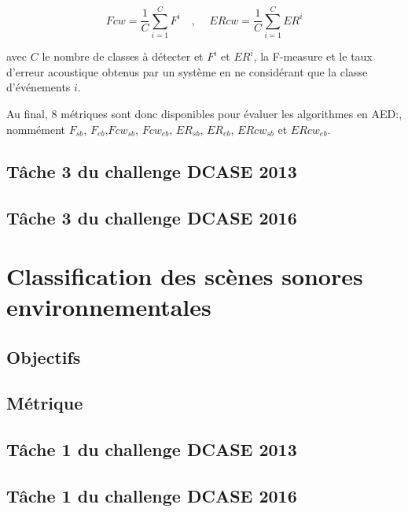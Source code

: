 \begin{equation}
\label{eq:ch7_eq3}
Fcw=\dfrac{1}{C}\sum_{i=1}^C F^i \quad \textrm{, } \quad ERcw=\dfrac{1}{C}\sum_{i=1}^C ER^i
\end{equation}

avec $C$ le nombre de classes à détecter et $F^i$ et $ER^i$, la F-measure et le taux d'erreur acoustique obtenus par un système en ne considérant que la classe d'événements $i$. 

Au final, 8 métriques sont donc disponibles pour évaluer les algorithmes en AED:, nommément $F_{sb}$, $F_{eb}$,$Fcw_{sb}$, $Fcw_{eb}$, $ER_{sb}$, $ER_{eb}$, $ERcw_{sb}$ et $ERcw_{eb}$.

\subsection{Tâche 3 du challenge DCASE 2013}
\label{sec:ch6_dcase2013AED}

\citep{Giannoulis2013database, giannoulis2013detection, Stowell15}

\subsection{Tâche 3 du challenge DCASE 2016}
\label{sec:ch6_dcase2016AED}

\section{Classification des scènes sonores environnementales}
\label{sec:ch6_ASC}

\subsection{Objectifs}
\label{sec:ch6_objASC}


\subsection{Métrique}
\label{sec:ch6_metriqueASC}

\subsection{Tâche 1 du challenge DCASE 2013}
\label{sec:ch6_dcase2013ASC}

\subsection{Tâche 1 du challenge DCASE 2016}
\label{sec:ch6_dcase2016ASC}

